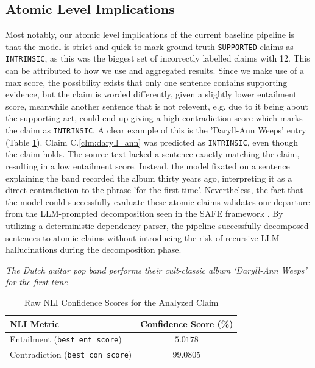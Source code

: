 \subsection{Atomic Level Implications}
Most notably, our atomic level implications of the current baseline pipeline is that the model is strict and quick to mark ground-truth \texttt{SUPPORTED} claims as \texttt{INTRINSIC}, as this was the biggest set of incorrectly labelled claims with 12. This can be attributed to how we use \rob and aggregated results. Since we make use of a max score, the possibility exists that only one sentence contains supporting evidence, but the claim is worded differently, given a slightly lower entailment score, meanwhile another sentence that is not relevent, e.g. due to it being about the supporting act,  could end up giving a high contradiction score which marks the claim as \texttt{INTRINSIC}. A clear example of this is the 'Daryll-Ann Weeps' entry (Table \ref{tab:daryll_ann_example}). Claim C.\ref{clm:daryll_ann} was predicted as \texttt{INTRINSIC}, even though the claim holds. The source text lacked a sentence exactly matching the claim, resulting in a low entailment score. Instead, the model fixated on a sentence explaining the band recorded the album thirty years ago, interpreting it as a direct contradiction to the phrase 'for the first time'.
Nevertheless, the fact that the \rob model could successfully evaluate these atomic claims validates our departure from the LLM-prompted decomposition seen in the SAFE framework \cite{safe2024longform}. By utilizing a deterministic dependency parser, the pipeline successfully decomposed sentences to atomic claims without introducing the risk of recursive LLM hallucinations during the decomposition phase.
\begin{table}[htbp]
    \vspace{0.2cm}
    \begin{flushleft}
         \textit{The Dutch guitar pop band performs their cult-classic album `Daryll-Ann Weeps' for the first time}
    \end{flushleft}
    \vspace{-0.3cm} %
    \centering
    \begin{tabular}{lc}
        \toprule
        \textbf{NLI Metric} & \textbf{Confidence Score (\%)} \\
        \midrule
        Entailment (\texttt{best\_ent\_score}) & $5.0178$ \\
        Contradiction (\texttt{best\_con\_score}) & $99.0805$ \\
        \bottomrule
    \end{tabular}
    \caption{Raw NLI Confidence Scores for the Analyzed Claim}
    \label{tab:daryll_ann_example}
\end{table}


